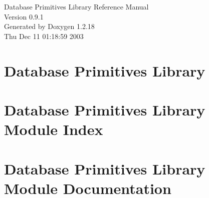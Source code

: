 \documentclass[letterpaper]{book}
\begin{document}
\begin{titlepage}
\vspace*{7cm}
\begin{center}
{\Large Database Primitives Library Reference Manual\\[1ex]\large Version 0.9.1}\\
\vspace*{1cm}
{\large Generated by Doxygen 1.2.18}\\
\vspace*{0.5cm}
{\small Thu Dec 11 01:18:59 2003}\\
\end{center}
\end{titlepage}
\clearemptydoublepage
{}
\tableofcontents
\clearemptydoublepage
{}
\chapter{Database Primitives Library}
\label{index}\hypertarget{index}{}
\chapter{Database Primitives Library Module Index}

\chapter{Database Primitives Library Module Documentation}





\printindex
\end{document}

